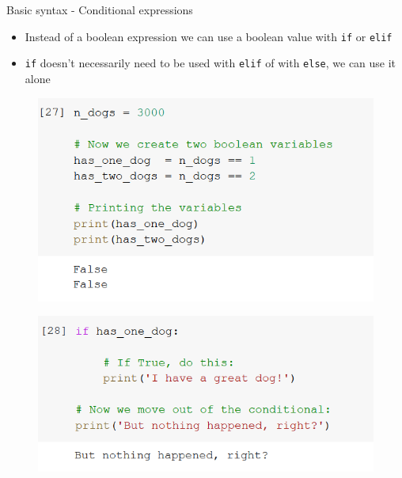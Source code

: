 \documentclass[aspectratio=169]{beamer}
\begin{document}
\begin{frame}{Basic syntax - Conditional expressions}

	\begin{itemize}
		\item Instead of a boolean expression we can use a boolean value with \texttt{if} or \texttt{elif}
		\item \texttt{if} doesn't necessarily need to be used with \texttt{elif} of with \texttt{else}, we can use it alone
	\end{itemize}

	\begin{multicols}{2}

		\begin{figure}
			\centering
			\includegraphics[width=\linewidth]{img/boolean_variables.png}
		\end{figure}
		\begin{figure}
			\centering
			\includegraphics[width=\linewidth]{img/if_alone.png}
		\end{figure}

	\end{multicols}

\end{frame}
\end{document}
